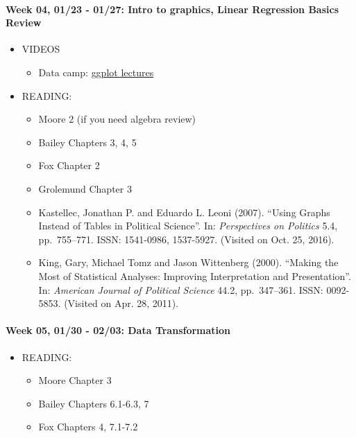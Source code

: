 \documentclass[11pt,]{article}
\providecommand{\tightlist}{%
  \setlength{\itemsep}{0pt}\setlength{\parskip}{0pt}}
\begin{document}
\paragraph{Week 04, 01/23 - 01/27: Intro to graphics, Linear Regression
Basics
Review}\label{week-04-0123---0127-intro-to-graphics-linear-regression-basics-review}

\begin{itemize}
\tightlist
\item
  VIDEOS

  \begin{itemize}
  \tightlist
  \item
    Data camp:
    \href{https://www.datacamp.com/courses/data-visualization-with-ggplot2-1}{ggplot
    lectures}
  \end{itemize}
\item
  READING:

  \begin{itemize}
  \item
    Moore 2 (if you need algebra review)
  \item
    Bailey Chapters 3, 4, 5
  \item
    Fox Chapter 2
  \item
    Grolemund Chapter 3
  \item
     Kastellec, Jonathan P. and Eduardo L. Leoni
    (2007). ``Using Graphs Instead of Tables in Political Science''. In:
    \emph{Perspectives on Politics} 5.4, pp.~755--771. ISSN: 1541-0986,
    1537-5927. (Visited on Oct. 25, 2016).
  \item
     King, Gary, Michael Tomz and Jason Wittenberg
    (2000). ``Making the Most of Statistical Analyses: Improving
    Interpretation and Presentation''. In:
    \emph{American Journal of Political Science} 44.2, pp.~347--361.
    ISSN: 0092-5853. (Visited on Apr. 28, 2011).
  \end{itemize}
\end{itemize}

\paragraph{Week 05, 01/30 - 02/03: Data
Transformation}\label{week-05-0130---0203-data-transformation}

\begin{itemize}
\tightlist
\item
  READING:

  \begin{itemize}
  \tightlist
  \item
    Moore Chapter 3
  \item
    Bailey Chapters 6.1-6.3, 7
  \item
    Fox Chapters 4, 7.1-7.2
  \end{itemize}
\end{itemize}
\end{document}
